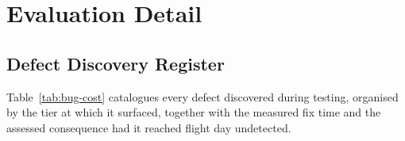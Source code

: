 
\section{Evaluation Detail}\label{app:eval-detail}

\subsection{Defect Discovery Register}\label{app:bug-cost}

Table~\ref{tab:bug-cost} catalogues every defect discovered during testing, organised by the tier at which it surfaced, together with the measured fix time and the assessed consequence had it reached flight day undetected.


